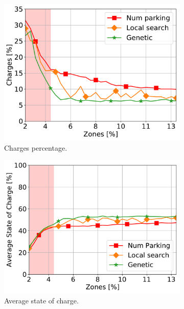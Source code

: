 \begin{figure}[t!]
	\begin{center}
		\begin{subfigure}{0.49\textwidth}
			\includegraphics[width=\columnwidth]{figures/Needed_AmountRechargePerc.pdf}
			\caption{Charges percentage.}
			\label{fig:7_7a_recharge_Needed}
		\end{subfigure}
		\begin{subfigure}{0.49\textwidth}
			\includegraphics[width=\columnwidth]{figures/AvgSOC_comparison_N}
			\caption{Average state of charge.}
			\label{fig:7_7a_asoc_Needed}
		\end{subfigure}
		\begin{subfigure}{0.49\textwidth}

\end{subfigure}
\end{center}
\end{figure}
